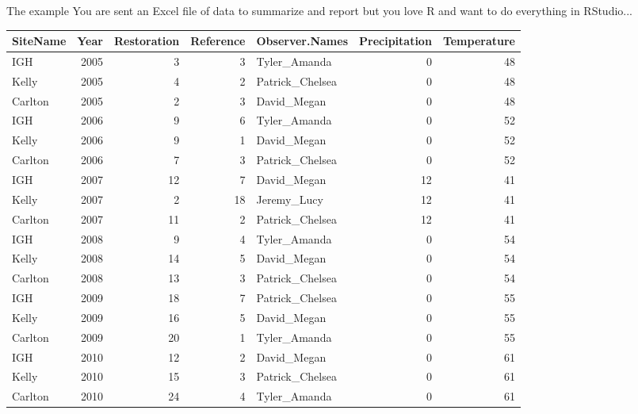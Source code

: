 \documentclass[xcolor=svgnames]{beamer}\usepackage{graphicx, color}
\begin{document}
\begin{frame}[shrink]{The example}
You are sent an Excel file of data to summarize and report but you love R and want to do everything in RStudio...
\begin{table}[ht]
\centering
{\scriptsize
\begin{tabular}{lrrrlrr}
  \hline
SiteName & Year & Restoration & Reference & Observer.Names & Precipitation & Temperature \\ 
  \hline
IGH &  2005 &     3 &     3 & Tyler\_Amanda &     0 &    48 \\ 
  Kelly &  2005 &     4 &     2 & Patrick\_Chelsea &     0 &    48 \\ 
  Carlton &  2005 &     2 &     3 & David\_Megan &     0 &    48 \\ 
  IGH &  2006 &     9 &     6 & Tyler\_Amanda &     0 &    52 \\ 
  Kelly &  2006 &     9 &     1 & David\_Megan &     0 &    52 \\ 
  Carlton &  2006 &     7 &     3 & Patrick\_Chelsea &     0 &    52 \\ 
  IGH &  2007 &    12 &     7 & David\_Megan &    12 &    41 \\ 
  Kelly &  2007 &     2 &    18 & Jeremy\_Lucy &    12 &    41 \\ 
  Carlton &  2007 &    11 &     2 & Patrick\_Chelsea &    12 &    41 \\ 
  IGH &  2008 &     9 &     4 & Tyler\_Amanda &     0 &    54 \\ 
  Kelly &  2008 &    14 &     5 & David\_Megan &     0 &    54 \\ 
  Carlton &  2008 &    13 &     3 & Patrick\_Chelsea &     0 &    54 \\ 
  IGH &  2009 &    18 &     7 & Patrick\_Chelsea &     0 &    55 \\ 
  Kelly &  2009 &    16 &     5 & David\_Megan &     0 &    55 \\ 
  Carlton &  2009 &    20 &     1 & Tyler\_Amanda &     0 &    55 \\ 
  IGH &  2010 &    12 &     2 & David\_Megan &     0 &    61 \\ 
  Kelly &  2010 &    15 &     3 & Patrick\_Chelsea &     0 &    61 \\ 
  Carlton &  2010 &    24 &     4 & Tyler\_Amanda &     0 &    61 \\ 
   \hline
\end{tabular}
}
\end{table}


\end{frame}
\end{document}
